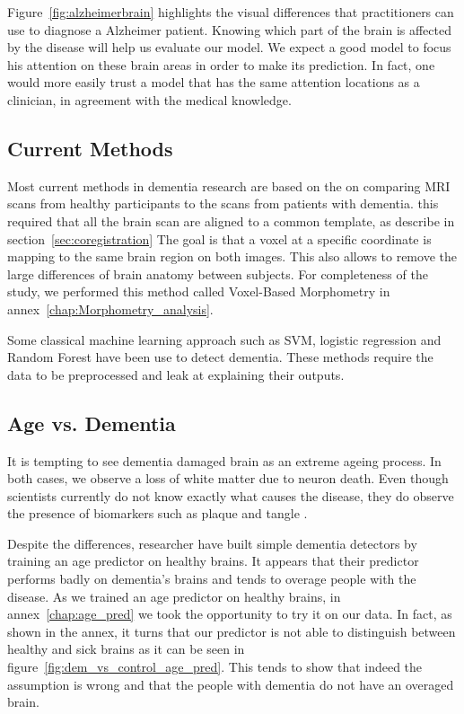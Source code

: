 Figure~\ref{fig:alzheimerbrain} highlights the visual differences that practitioners can use to diagnose a Alzheimer patient. Knowing which part of the brain is affected by the disease will help us evaluate our model. We expect a good model to focus his attention on these brain areas in order to make its prediction. In fact, one would more easily trust a model that has the same attention locations as a clinician, in agreement with the medical knowledge.

\subsection{Current Methods}
Most current methods in dementia research are based on the on comparing MRI scans from healthy participants to the scans from patients with dementia. this required that all the brain scan are aligned to a common template, as describe in section~\ref{sec:coregistration} The goal is that a voxel at a specific coordinate is mapping to the same brain region on both images. This also allows to remove the large differences of brain anatomy between subjects. For completeness of the study, we performed this method called Voxel-Based Morphometry\cite{voxel_based_morphometry_ASHBURNER2000805} in annex~\ref{chap:Morphometry_analysis}.

Some classical machine learning\cite{classical_ml_methods_SAMPERGONZALEZ2018504} approach such as SVM\cite{svm_article}, logistic regression and Random Forest\cite{random_forest_10.1023/A:1010933404324} have been use to detect dementia. These methods require the data to be preprocessed and leak at explaining their outputs.


\subsection{Age vs. Dementia}

It is tempting to see dementia damaged brain as an extreme ageing process. In both cases, we observe a loss of white matter due to neuron death. Even though scientists currently do not know exactly what causes the disease, they do observe the presence of biomarkers such as plaque and tangle \cite{alzheimer_past_present_future}.

Despite the differences, researcher\cite{brain_age_10.3389/fneur.2019.00789} have built simple dementia detectors by training an age predictor on healthy brains. It appears that their predictor performs badly on dementia's brains and tends to overage people with the disease. As we trained an age predictor on healthy brains, in annex~\ref{chap:age_pred} we took the opportunity to try it on our data. In fact, as shown in the annex, it turns that our predictor is not able to distinguish between healthy and sick brains as it can be seen in figure~\ref{fig:dem_vs_control_age_pred}. This tends to show that indeed the assumption is wrong and that the people with dementia do not have an overaged brain.

